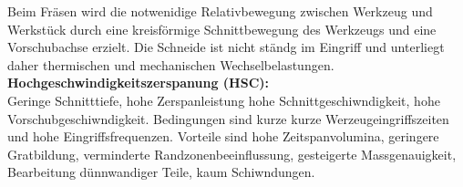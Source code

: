 Beim Fräsen wird die notwenidige Relativbewegung zwischen Werkzeug und Werkstück durch eine kreisförmige Schnittbewegung des Werkzeugs und eine Vorschubachse erzielt. Die Schneide ist nicht ständg im Eingriff und unterliegt daher thermischen und mechanischen Wechselbelastungen.\\

\textbf{Hochgeschwindigkeitszerspanung (HSC):}\\
Geringe Schnitttiefe, hohe Zerspanleistung hohe Schnittgeschiwndigkeit, hohe Vorschubgeschiwndigkeit. Bedingungen sind kurze kurze Werzeugeingriffszeiten und hohe Eingriffsfrequenzen. Vorteile sind hohe Zeitspanvolumina, geringere Gratbildung, verminderte Randzonenbeeinflussung, gesteigerte Massgenauigkeit, Bearbeitung dünnwandiger Teile, kaum Schiwndungen.\\